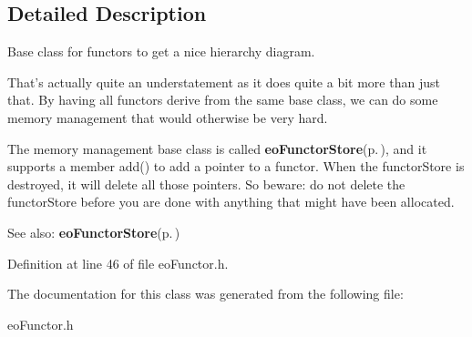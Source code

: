 \subsection{Detailed Description}
Base class for functors to get a nice hierarchy diagram. 

That's actually quite an understatement as it does quite a bit more than just that. By having all functors derive from the same base class, we can do some memory management that would otherwise be very hard.

The memory management base class is called {\bf eo\-Functor\-Store}{\rm (p.\,\pageref{classeo_functor_store})}, and it supports a member add() to add a pointer to a functor. When the functor\-Store is destroyed, it will delete all those pointers. So beware: do not delete the functor\-Store before you are done with anything that might have been allocated.

\begin{Desc}
\item[See also:]{\bf eo\-Functor\-Store}{\rm (p.\,\pageref{classeo_functor_store})} \end{Desc}




Definition at line 46 of file eo\-Functor.h.

The documentation for this class was generated from the following file:\begin{CompactItemize}
\item 
eo\-Functor.h\end{CompactItemize}

